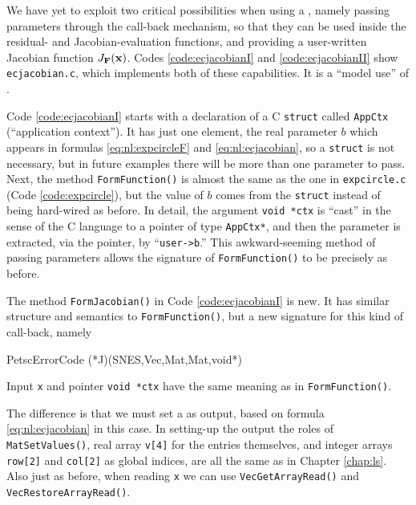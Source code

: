 We have yet to exploit two critical possibilities when using a \pSNES, namely passing parameters through the call-back mechanism, so that they can be used inside the residual- and Jacobian-evaluation functions, and providing a user-written Jacobian function $J_{\mathbf{F}}(\mathbf{x})$.  Codes \ref{code:ecjacobianI} and \ref{code:ecjacobianII} show  \texttt{ecjacobian.c}, which implements both of these capabilities.  It is a ``model use'' of \pSNES.

Code \ref{code:ecjacobianI} starts with a declaration of a C \texttt{struct} called \texttt{AppCtx} (``application context'').  It has just one element, the real parameter $b$ which appears in formulas \eqref{eq:nl:expcircleF} and \eqref{eq:nl:ecjacobian}, so a \texttt{struct} is not necessary, but in future examples there will be more than one parameter to pass.  Next, the method \texttt{FormFunction()} is almost the same as the one in \texttt{expcircle.c} (Code \ref{code:expcircle}), but the value of $b$ comes from the \texttt{struct} instead of being hard-wired as before.  In detail, the argument \texttt{void *ctx} is ``cast'' in the sense of the C language \citep{KernighanRitchie1988} to a pointer of type \texttt{AppCtx*}, and then the parameter is extracted, via the pointer, by ``\texttt{user->b}.''  This awkward-seeming method of passing parameters allows the signature of \texttt{FormFunction()} to be precisely as before.


The method \texttt{FormJacobian()} in Code \ref{code:ecjacobianI} is new.  It has similar structure and semantics to \texttt{FormFunction()}, but a new signature for this kind of call-back, namely
\begin{code}
PetscErrorCode (*J)(SNES,Vec,Mat,Mat,void*)
\end{code}
Input \pVec \texttt{x} and pointer \texttt{void *ctx} have the same meaning as in \texttt{FormFunction()}.

The difference is that we must set a \pMat as output, based on formula \eqref{eq:nl:ecjacobian} in this case.  In setting-up the output \pMat the roles of \texttt{MatSetValues()}, real array \texttt{v[4]} for the entries themselves, and integer arrays \texttt{row[2]} and \texttt{col[2]} as global indices, are all the same as in Chapter \ref{chap:ls}.  Also just as before, when reading \texttt{x} we can use \texttt{VecGetArrayRead()} and \texttt{VecRestoreArrayRead()}.

